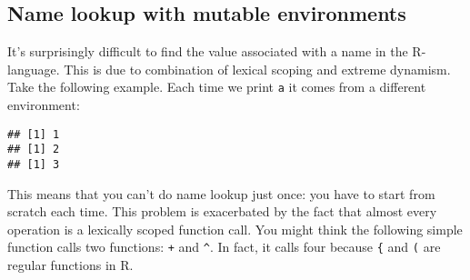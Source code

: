\hypertarget{name-lookup-with-mutable-environments}{%
\subsection{Name lookup with mutable
environments}\label{name-lookup-with-mutable-environments}}

It's surprisingly difficult to find the value associated with a name in
the R-language. This is due to combination of lexical scoping and
extreme dynamism. Take the following example. Each time we print
\texttt{a} it comes from a different environment:

\begin{Shaded}
\begin{Highlighting}[]
\StringTok{ }
\StringTok{ }\NormalTok{() \{}
\StringTok{ }\NormalTok{() \{}
    \NormalTok{(}\NormalTok{, }\NormalTok{, } \NormalTok{())}
\StringTok{ }
\NormalTok{  \}}
  \NormalTok{()}
\NormalTok{\}}
\NormalTok{()}
\end{Highlighting}
\end{Shaded}

\begin{verbatim}
## [1] 1
## [1] 2
## [1] 3
\end{verbatim}

This means that you can't do name lookup just once: you have to start
from scratch each time. This problem is exacerbated by the fact that
almost every operation is a lexically scoped function call. You might
think the following simple function calls two functions: \texttt{+} and
\texttt{\^{}}. In fact, it calls four because \texttt{\{} and \texttt{(}
are regular functions in R.

\begin{Shaded}
\begin{Highlighting}[]
\StringTok{ }
\OperatorTok{+}\StringTok{ }\OperatorTok{^}\StringTok{ }
\NormalTok{\}}
\end{Highlighting}
\end{Shaded}

